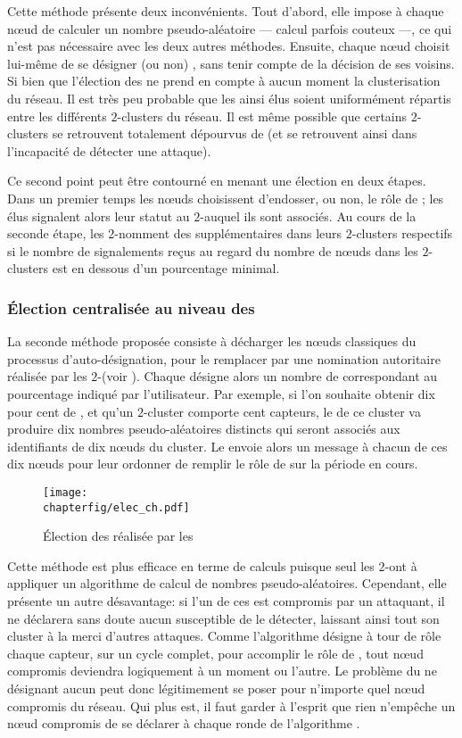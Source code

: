 Cette méthode présente deux inconvénients.
Tout d'abord, elle impose à chaque nœud de calculer un nombre pseudo-aléatoire --- calcul parfois couteux ---, ce qui n'est pas nécessaire avec les deux autres méthodes.
Ensuite, chaque nœud choisit lui-même de se désigner (ou non) \cn, sans tenir compte de la décision de ses voisins.
Si bien que l'élection des \cns ne prend en compte à aucun moment la clusterisation du réseau.
Il est très peu probable que les \cns ainsi élus soient uniformément répartis entre les différents $2$-clusters du réseau.
Il est même possible que certains $2$-clusters se retrouvent totalement dépourvus de \cns (et se retrouvent ainsi dans l'incapacité de détecter une attaque).

Ce second point peut être contourné en menant une élection en deux étapes.
Dans un premier temps les nœuds choisissent d'endosser, ou non, le rôle de \cn; les \cns élus signalent alors leur statut au $2$-\CH auquel ils sont associés.
Au cours de la seconde étape, les $2$-\CH nomment des \cns supplémentaires dans leurs $2$-clusters respectifs si le nombre de signalements reçus au regard du nombre de nœuds dans les $2$-clusters est en dessous d'un pourcentage minimal.

        \subsubsection{Élection centralisée au niveau des \chs}
La seconde méthode proposée consiste à décharger les nœuds classiques du processus d'auto-désignation, pour le remplacer par une nomination autoritaire réalisée par les $2$-\chs (voir ).
Chaque \CH désigne alors un nombre de \cns correspondant au pourcentage indiqué par l'utilisateur.
Par exemple, si l'on souhaite obtenir dix pour cent de \cns, et qu'un $2$-cluster comporte cent capteurs, le \CH de ce cluster va produire dix nombres pseudo-aléatoires distincts qui seront associés aux identifiants de dix nœuds du cluster.
Le \CH envoie alors un message à chacun de ces dix nœuds pour leur ordonner de remplir le rôle de \cn sur la période en cours.
\begin{figure}[ht]
    \centering
    \texttt{[image: \\chapterfig/elec\_ch.pdf]}
    \caption{Élection des \cns réalisée par les \chs}\label{sa:fig:elecch}
\end{figure}

Cette méthode est plus efficace en terme de calculs puisque seul les $2$-\CH ont à appliquer un algorithme de calcul de nombres pseudo-aléatoires.
Cependant, elle présente un autre désavantage: si l'un de ces \CH est compromis par un attaquant, il ne déclarera sans doute aucun \cn susceptible de le détecter, laissant ainsi tout son cluster à la merci d'autres attaques.
Comme l'algorithme \leach désigne à tour de rôle chaque capteur, sur un cycle complet, pour accomplir le rôle de \CH, tout nœud compromis deviendra logiquement \CH à un moment ou l'autre.
Le problème du \CH ne désignant aucun \cn peut donc légitimement se poser pour n'importe quel nœud compromis du réseau.
Qui plus est, il faut garder à l'esprit que rien n'empêche un nœud compromis de se déclarer \ch à chaque ronde de l'algorithme \leach.

